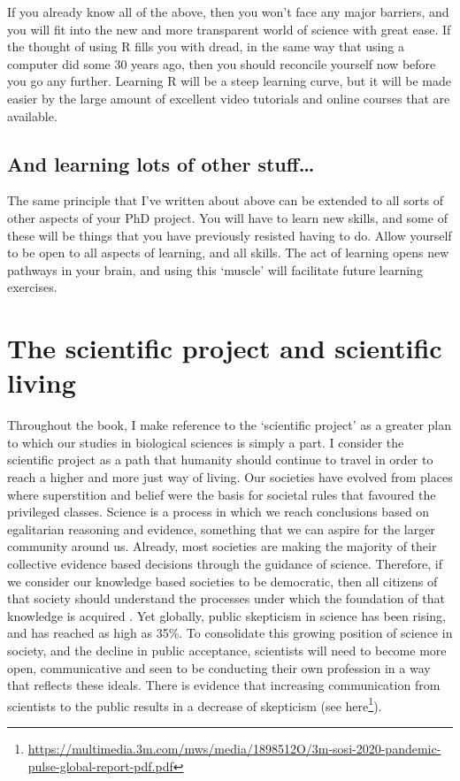 \documentclass[
]{krantz}
\renewcommand{\href}[2]{#2\footnote{\url{#1}}}
\begin{document}
If you already know all of the above, then you won't face any major barriers, and you will fit into the new and more transparent world of science with great ease. If the thought of using R fills you with dread, in the same way that using a computer did some 30 years ago, then you should reconcile yourself now before you go any further. Learning R will be a steep learning curve, but it will be made easier by the large amount of excellent video tutorials and online courses that are available.

\hypertarget{and-learning-lots-of-other-stuff}{%
\subsection{And learning lots of other stuff\ldots{}}\label{and-learning-lots-of-other-stuff}}

The same principle that I've written about above can be extended to all sorts of other aspects of your PhD project. You will have to learn new skills, and some of these will be things that you have previously resisted having to do. Allow yourself to be open to all aspects of learning, and all skills. The act of learning opens new pathways in your brain, and using this `muscle' will facilitate future learning exercises.

\hypertarget{lifescientific}{%
\section{The scientific project and scientific living}\label{lifescientific}}

Throughout the book, I make reference to the `scientific project' as a greater plan to which our studies in biological sciences is simply a part. I consider the scientific project as a path that humanity should continue to travel in order to reach a higher and more just way of living. Our societies have evolved from places where superstition and belief were the basis for societal rules that favoured the privileged classes. Science is a process in which we reach conclusions based on egalitarian reasoning and evidence, something that we can aspire for the larger community around us. Already, most societies are making the majority of their collective evidence based decisions through the guidance of science. Therefore, if we consider our knowledge based societies to be democratic, then all citizens of that society should understand the processes under which the foundation of that knowledge is acquired \citep{sagan2011demon}. Yet globally, public skepticism in science has been rising, and has reached as high as 35\%. To consolidate this growing position of science in society, and the decline in public acceptance, scientists will need to become more open, communicative and seen to be conducting their own profession in a way that reflects these ideals. There is evidence that increasing communication from scientists to the public results in a decrease of skepticism (\href{https://multimedia.3m.com/mws/media/1898512O/3m-sosi-2020-pandemic-pulse-global-report-pdf.pdf}{see here}).
\end{document}
